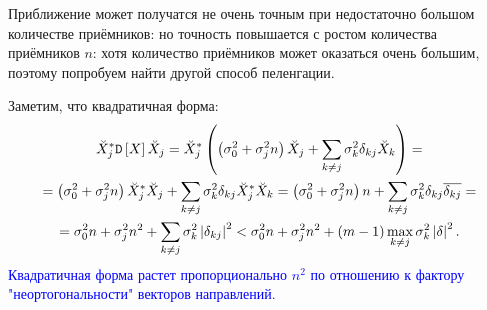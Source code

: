 Приближение может получатся не очень точным при недостаточно большом количестве приёмников:
\noindent но точность повышается с ростом количества приёмников $n$:
\noindent хотя количество приёмников может оказаться очень большим, поэтому попробуем найти другой способ пеленгации.

Заметим, что квадратичная форма:
\begin{multline*}
    \breve{X}_j^* \mathtt{D} \left [ X \right ] \breve{X}_j
    = \breve{X}_j^* \left( \left( \sigma_0^2 + \sigma_j^2 n \right) \breve{X}_j + \sum_{k \neq j} \sigma_k^2 \delta_{kj} \breve{X}_k \right) = \\
    = \left( \sigma_0^2 + \sigma_j^2 n \right) \breve{X}_j^* \breve{X}_j + \sum_{k \neq j} \sigma_k^2 \delta_{kj} \breve{X}_j^* \breve{X}_k
    = \left( \sigma_0^2 + \sigma_j^2 n \right) n + \sum_{k \neq j} \sigma_k^2 \delta_{kj} \overline{\delta_{kj}} = \\
    = \sigma_0^2 n + \sigma_j^2 n^2 + \sum_{k \neq j} \sigma_k^2 \left | \delta_{kj} \right |^2
    < \sigma_0^2 n + \sigma_j^2 n^2 + (m-1) \max \limits_{k \neq j} \sigma_k^2 \left | \delta \right |^2 .
\end{multline*}
\textcolor{blue}{Квадратичная форма растет пропорционально $n^2$ по отношению к фактору "неортогональности"{} векторов направлений.}

